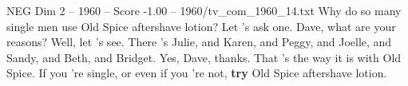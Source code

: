 \begin{textsample}{NEG Dim 2 – 1960 – Score -1.00 – 1960/tv\_com\_1960\_14.txt}  \label{ex:f2_neg_078}
Why do so many single men use Old Spice aftershave lotion?
Let 's ask one.
Dave, what are your reasons?
Well, let 's see.
There 's Julie, and Karen, and Peggy, and Joelle, and Sandy, and Beth, and Bridget.
Yes, Dave, thanks.
That 's the way it is with Old Spice.
If you 're single, or even if you 're not, \textbf{try} Old Spice aftershave lotion.

\end{textsample}
